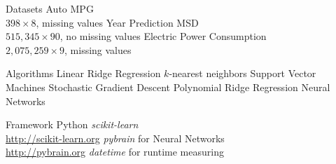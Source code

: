 \begin{frame}{Datasets}
\bs
\bi
\mi Auto MPG\\
$398\times8$, missing values
\mi Year Prediction MSD\\
$515,345\times90$, no missing values
\mi Electric Power Consumption\\
$2,075,259\times9$, missing values
\ei

\end{frame}

\begin{frame}{Algorithms}
\bs
\bi
\mi Linear Ridge Regression
\mi $k$-nearest neighbors
\mi Support Vector Machines
\mi Stochastic Gradient Descent
\ms
\mi Polynomial Ridge Regression
\mi Neural Networks
\ei
\end{frame}

\begin{frame}{Framework}
\bs
\bi
\mi Python
\mi \textit{scikit-learn}\\
\url{http://scikit-learn.org}
\mi \textit{pybrain} for Neural Networks\\
\url{http://pybrain.org}
\mi \textit{datetime} for runtime measuring
\ei
\end{frame}
